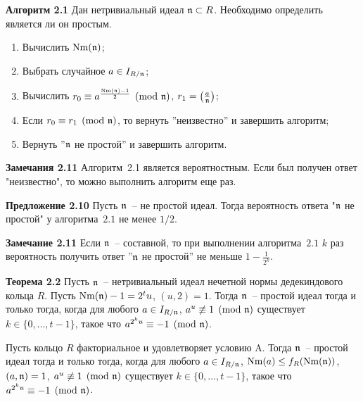 \documentclass[_00_autoref.tex]{subfiles}
\begin{document}
\textbf{Алгоритм 2.1}\label{algorithm:solovay_strassen}
    Дан нетривиальный идеал $\mathfrak{n} \subset R$.
    Необходимо определить является ли он простым.

    \begin{enumerate}
        \item Вычислить $\textrm{Nm}(\mathfrak{n})$;
        
        \item Выбрать случайное $a \in I_{R/\mathfrak{n}}$;

        \item Вычислить $r_0 \equiv a^{\frac{\textrm{Nm}(\mathfrak{n}) - 1}{2}} \pmod{\mathfrak{n}}$, $r_1 = \left(\frac{a}{\mathfrak{n}}\right)$;

        \item Если $r_0 \equiv r_1 \pmod{\mathfrak{n}}$, то вернуть ''неизвестно'' и завершить алгоритм;

        \item Вернуть ''$\mathfrak{n}$ не простой'' и завершить алгоритм.
    \end{enumerate}

\textbf{Замечания 2.11}
    Алгоритм~2.1 является вероятностным.
    Если был получен ответ "неизвестно", то можно выполнить алгоритм еще раз.

\textbf{Предложение 2.10}
    Пусть $\mathfrak{n}$~-- не простой идеал.
    Тогда вероятность ответа "$\mathfrak{n}$ не простой" у алгоритма~$2.1$ не менее $1/2$.

\textbf{Замечание 2.11}
    Если $\mathfrak{n}$~-- составной, то при выполнении алгоритма~$2.1$ $k$ раз вероятность получить ответ ''$\mathfrak{n}$ не простой'' не меньше $1 - \frac{1}{2^k}$.


\textbf{Теорема 2.2}\label{theorem:miller_criteria}
    Пусть $\mathfrak{n}$~-- нетривиальный идеал нечетной нормы дедекиндового кольца $R$.
    Пусть $\textrm{Nm}(\mathfrak{n}) - 1 = 2^t u$, $(u, 2) = 1$.
    Тогда $\mathfrak{n}$~-- простой идеал тогда и только тогда, когда для любого $a \in I_{R/\mathfrak{n}}$, $a^u \not\equiv 1 \pmod{\mathfrak{n}}$ существует $k\in \{0, \dots, t-1\}$, такое что $a^{2^{k}u} \equiv -1 \pmod{\mathfrak{n}}$.

    Пусть кольцо $R$ факториальное и удовлетворяет условию A.
    Тогда $\mathfrak{n}$~-- простой идеал тогда и только тогда, когда для любого $a \in I_{R/\mathfrak{n}}$, $\textrm{Nm}(a) \le f_R(\textrm{Nm}(\mathfrak{n}))$, $(a, \mathfrak{n}) = 1$, $a^u \not\equiv 1 \pmod{\mathfrak{n}}$ существует $k\in \{0, \dots, t-1\}$, такое что $a^{2^{k}u} \equiv -1 \pmod{\mathfrak{n}}$.
\end{document}
